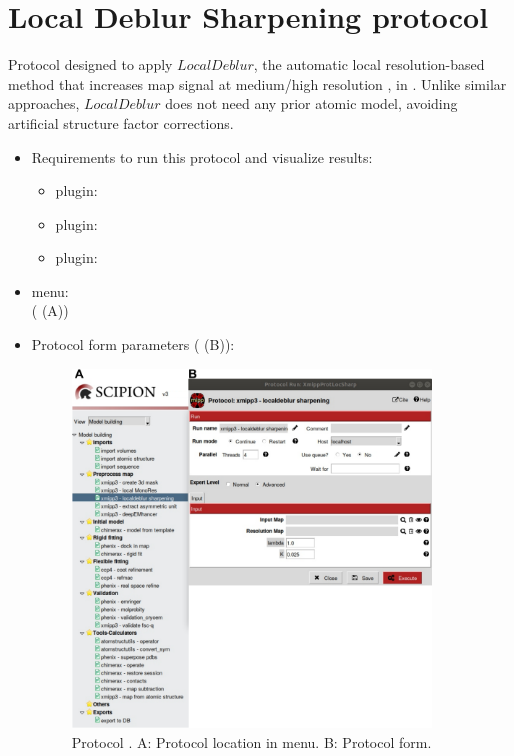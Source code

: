 \section{Local Deblur Sharpening protocol}
\label{app:localDeblurSharpening}%

Protocol designed to apply $LocalDeblur$, the automatic local resolution-based method that increases map signal at medium/high resolution \citep{ramirez2018}, in \scipion. Unlike similar approaches, $LocalDeblur$ does not need any prior atomic model, avoiding artificial structure factor corrections.

\begin{itemize}
 \item Requirements to run this protocol and visualize results:
    \begin{itemize}
        \item \scipion plugin: 
        \item \scipion plugin: 
        \item \scipion plugin: 
    \end{itemize}
 \item \scipion menu:\\
   ( (A))
  
 \item Protocol form parameters ( (B)):
  
    \begin{figure}[H]
     \centering 
     \captionsetup{width=.9\linewidth} 
     \includegraphics[width=0.90\textwidth]{Images_appendix/Fig208}
     \caption{Protocol . A: Protocol location in \scipion menu. B: Protocol form.}
     \label{fig:app_localdeblur_1}
    \end{figure}
    

\end{itemize}
